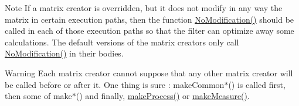 \begin{Indent}
{\begin{DoxyNote}{Note}
If a matrix creator is overridden, but it does not modify in any way the matrix in certain execution paths, then the function {\ttfamily \mbox{\hyperlink{classKalman_1_1EKFilter_ae3350773ed390892c2dd6dfe9dfbca89}{No\+Modification()}}} should be called in each of those execution paths so that the filter can optimize away some calculations. The default versions of the matrix creators only call {\ttfamily \mbox{\hyperlink{classKalman_1_1EKFilter_ae3350773ed390892c2dd6dfe9dfbca89}{No\+Modification()}}} in their bodies. 
\end{DoxyNote}
\begin{DoxyWarning}{Warning}
Each matrix creator cannot suppose that any other matrix creator will be called before or after it. One thing is sure \+: {\ttfamily make\+Common$\ast$}() is called first, then some of {\ttfamily make$\ast$}() and finally, {\ttfamily \mbox{\hyperlink{classKalman_1_1EKFilter_a778232d397d981c08b3ca23ea800aa6a}{make\+Process()}}} or {\ttfamily \mbox{\hyperlink{classKalman_1_1EKFilter_aac9f6d80e5ec9e6ea2ccf045cb682df8}{make\+Measure()}}}. 


\end{DoxyWarning}}
\end{Indent}
